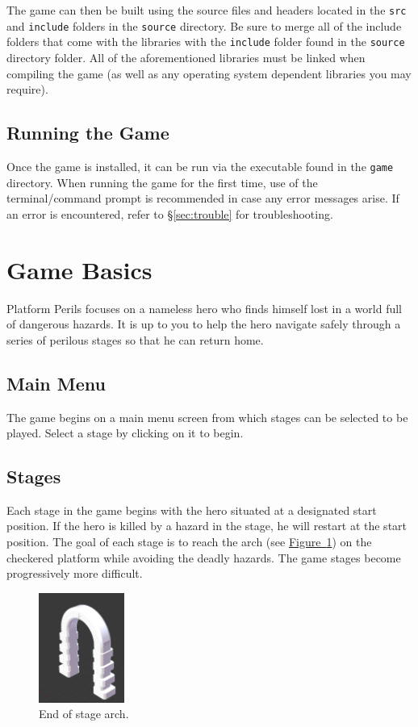 \documentclass[12pt, titlepage]{article}
\begin{document}
\noindent The game can then be built using the source files and headers located in the \texttt{src} and \texttt{include} folders in the \texttt{source} directory.  Be sure to merge all of the include folders that come with the libraries with the \texttt{include} folder found in the \texttt{source} directory folder.  All of the aforementioned libraries must be linked when compiling the game (as well as any operating system dependent libraries you may require).

\subsection{Running the Game}
Once the game is installed, it can be run via the executable found in the \texttt{game} directory.  When running the game for the first time, use of the terminal/command prompt is recommended in case any error messages arise.  If an error is encountered, refer to \hyperref[sec:trouble]{\S\ref*{sec:trouble}} for troubleshooting.


\section{Game Basics}
\label{sec:basics}
Platform Perils focuses on a nameless hero who finds himself lost in a world full of dangerous hazards.  It is up to you to help the hero navigate safely through a series of perilous stages so that he can return home.

\subsection{Main Menu}
The game begins on a main menu screen from which stages can be selected to be played.  Select a stage by clicking on it to begin.

\subsection{Stages}
\noindent Each stage in the game begins with the hero situated at a designated start position.  If the hero is killed by a hazard in the stage, he will restart at the start position.  The goal of each stage is to reach the arch (see \hyperref[fig:arch]{Figure~\ref*{fig:arch}}) on the checkered platform while avoiding the deadly hazards.  The game stages become progressively more difficult.

\begin{figure}[H]
\begin{center}
\includegraphics[width=0.25\textwidth]{door}
\caption{End of stage arch.} \label{fig:arch}
\end{center}
\end{figure}
\end{document}
